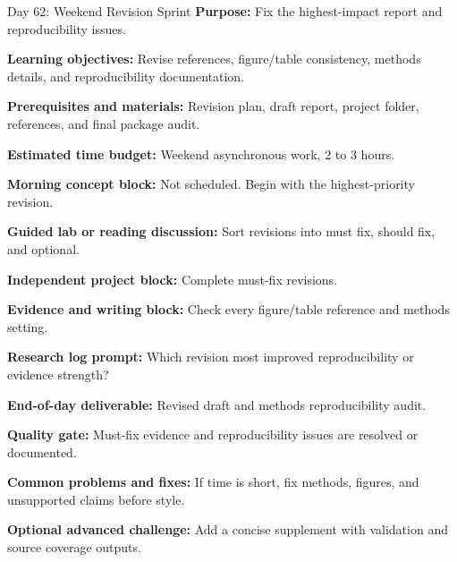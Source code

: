 \begin{dailybox}{Day 62: Weekend Revision Sprint}
\textbf{Purpose:} Fix the highest-impact report and reproducibility issues.

\textbf{Learning objectives:} Revise references, figure/table consistency, methods details, and reproducibility documentation.

\textbf{Prerequisites and materials:} Revision plan, draft report, project folder, references, and final package audit.

\textbf{Estimated time budget:} Weekend asynchronous work, 2 to 3 hours.

\textbf{Morning concept block:} Not scheduled. Begin with the highest-priority revision.

\textbf{Guided lab or reading discussion:} Sort revisions into must fix, should fix, and optional.

\textbf{Independent project block:} Complete must-fix revisions.

\textbf{Evidence and writing block:} Check every figure/table reference and methods setting.

\textbf{Research log prompt:} Which revision most improved reproducibility or evidence strength?

\textbf{End-of-day deliverable:} Revised draft and methods reproducibility audit.

\textbf{Quality gate:} Must-fix evidence and reproducibility issues are resolved or documented.

\textbf{Common problems and fixes:} If time is short, fix methods, figures, and unsupported claims before style.

\textbf{Optional advanced challenge:} Add a concise supplement with validation and source coverage outputs.
\end{dailybox}


